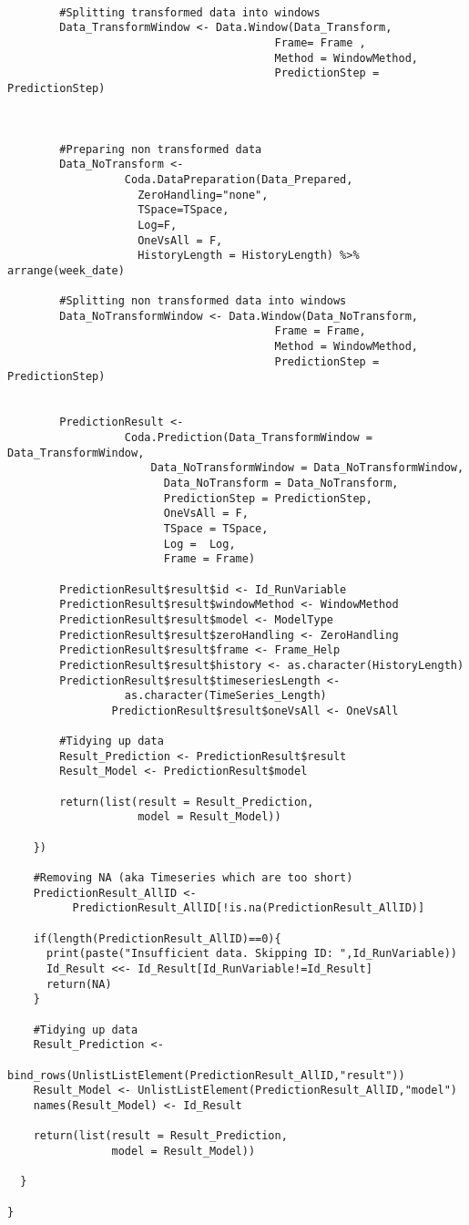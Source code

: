 \begin{verbatim}
        
        #Splitting transformed data into windows
        Data_TransformWindow <- Data.Window(Data_Transform,
                                         Frame= Frame ,
                                         Method = WindowMethod,
                                         PredictionStep = PredictionStep)
        
        
        
        #Preparing non transformed data 
        Data_NoTransform <- 
				  Coda.DataPreparation(Data_Prepared,
					ZeroHandling="none",
					TSpace=TSpace,
					Log=F, 
					OneVsAll = F,
					HistoryLength = HistoryLength) %>% arrange(week_date)
					
        #Splitting non transformed data into windows
        Data_NoTransformWindow <- Data.Window(Data_NoTransform,
                                         Frame = Frame,
                                         Method = WindowMethod,
                                         PredictionStep = PredictionStep)
        
        
        PredictionResult <- 
				  Coda.Prediction(Data_TransformWindow = Data_TransformWindow,
					  Data_NoTransformWindow = Data_NoTransformWindow,
						Data_NoTransform = Data_NoTransform, 
						PredictionStep = PredictionStep,
						OneVsAll = F,
						TSpace = TSpace,
						Log =  Log, 
						Frame = Frame)
						
        PredictionResult$result$id <- Id_RunVariable
        PredictionResult$result$windowMethod <- WindowMethod
        PredictionResult$result$model <- ModelType 
        PredictionResult$result$zeroHandling <- ZeroHandling
        PredictionResult$result$frame <- Frame_Help
        PredictionResult$result$history <- as.character(HistoryLength)
        PredictionResult$result$timeseriesLength <- 
				  as.character(TimeSeries_Length)
				PredictionResult$result$oneVsAll <- OneVsAll
        
        #Tidying up data
        Result_Prediction <- PredictionResult$result
        Result_Model <- PredictionResult$model
        
        return(list(result = Result_Prediction,
                    model = Result_Model))
        
    })
    
    #Removing NA (aka Timeseries which are too short)
    PredictionResult_AllID <- 
		  PredictionResult_AllID[!is.na(PredictionResult_AllID)]
    
    if(length(PredictionResult_AllID)==0){
      print(paste("Insufficient data. Skipping ID: ",Id_RunVariable))
      Id_Result <<- Id_Result[Id_RunVariable!=Id_Result]
      return(NA)
    }
    
    #Tidying up data
    Result_Prediction <- 
		  bind_rows(UnlistListElement(PredictionResult_AllID,"result"))
    Result_Model <- UnlistListElement(PredictionResult_AllID,"model")
    names(Result_Model) <- Id_Result
    
    return(list(result = Result_Prediction,
                model = Result_Model))
    
  }
  
}
\end{verbatim}